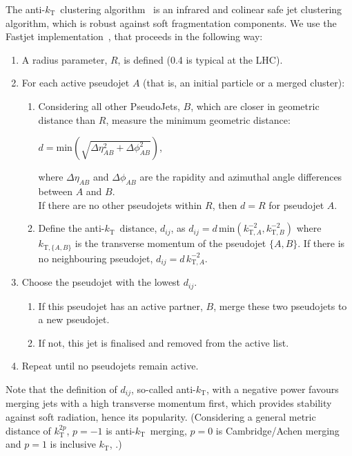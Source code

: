 \documentclass{webofc}
\newcommand{\akt}{anti-${k}_\text{T}$}
\begin{document}
The \akt\ clustering algorithm~\cite{Cacciari:2005hq,Matteo_Cacciari_2008}
is an infrared and colinear safe jet clustering algorithm, which is robust
against soft fragmentation components. We use the Fastjet
implementation~\cite{Cacciari:2011ma}, that proceeds in the following way:

\begin{enumerate}[itemsep=2pt,parsep=2pt,partopsep=0pt]
  \item A radius parameter, $R$, is defined (0.4 is typical at the LHC).
  \item For each active pseudojet $A$ (that is, an initial particle or a merged cluster):
  \begin{enumerate}
    \item Considering all other PseudoJets, $B$, which are closer in geometric
    distance than $R$, measure the minimum geometric distance:
    \begin{center}
      $d=\mathrm{min}\left( \sqrt{\Delta\eta_{AB}^2 + \Delta\phi_{AB}^2} \right)$,  
    \end{center}
    where $\Delta\eta_{AB}$ and $\Delta\phi_{AB}$ are the rapidity and azimuthal
    angle differences between $A$ and $B$.\\If there are no other pseudojets within $R$,
    then $d=R$ for pseudojet $A$.
    \item Define the \akt\ distance, $d_{ij}$, as $d_{ij} = d \,
    \mathrm{min}(k^{-2}_{\text{T},A}, k^{-2}_{\text{T},B})$ where
    $k_{\text{T},\{A,B\}}$ is the transverse momentum of the pseudojet $\{A,B\}$.
    If there is no neighbouring pseudojet, $d_{ij} = d \, k^{-2}_{\text{T},A}$.
  \end{enumerate}
  \item Choose the pseudojet with the lowest $d_{ij}$.
  \begin{enumerate}
    \item If this pseudojet has an active partner, $B$, merge these two
    pseudojets to a new pseudojet.
    \item If not, this jet is finalised and removed from the active list.
  \end{enumerate}
  \item Repeat until no pseudojets remain active.
\end{enumerate}

Note that the definition of $d_{ij}$, so-called \akt, with a negative power
favours merging jets with a high transverse momentum first, which provides stability against
soft radiation, hence its popularity. (Considering a general metric distance of
$k^{2p}_\text{T}$, $p=-1$ is \akt\ merging, $p=0$ is Cambridge/Achen merging and
$p=1$ is inclusive $k_\text{T}$, \cite{Matteo_Cacciari_2008}.)
\end{document}
